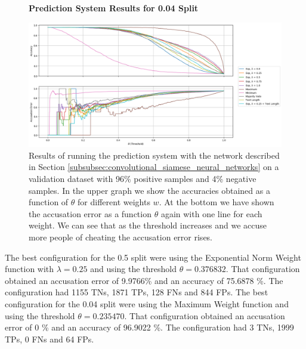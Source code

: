 \begin{figure}
    \centering
    \textbf{Prediction System Results for 0.04 Split}\par\medskip
    \includegraphics[width=\textwidth]{./pictures/experiments/Prediction_Network6_04.png}
    \caption{Results of running the prediction system with the network described
        in Section \ref{subsubsec:convolutional_siamese_neural_networks} on a
        validation dataset with 96\% positive samples and 4\% negative samples.
        In the upper graph we show the accuracies obtained as a function of
        $\theta$ for different weights $w$. At the bottom we have shown the
        accusation error as a function $\theta$ again with one line for each
        weight. We can see that as the threshold increases and we accuse more
        people of cheating the accusation error rises.}
    \label{fig:prediction_system_results_4}
\end{figure}

The best configuration for the 0.5 split were using the Exponential Norm Weight
function with $\lambda = 0.25$ and using the threshold $\theta = 0.376832$.
That configuration obtained an accusation error of 9.9766\% and an accuracy of
75.6878 \%. The configuration had 1155 \gls{TN}s, 1871 \gls{TP}s, 128 \gls{FN}s
and 844 \gls{FP}s. The best configuration for the 0.04 split were using the
Maximum Weight function and using the threshold $\theta = 0.235470$. That
configuration obtained an accusation error of 0 \% and an accuracy of 96.9022
\%. The configuration had 3 \gls{TN}s, 1999 \gls{TP}s, 0 \gls{FN}s and 64
\gls{FP}s.
